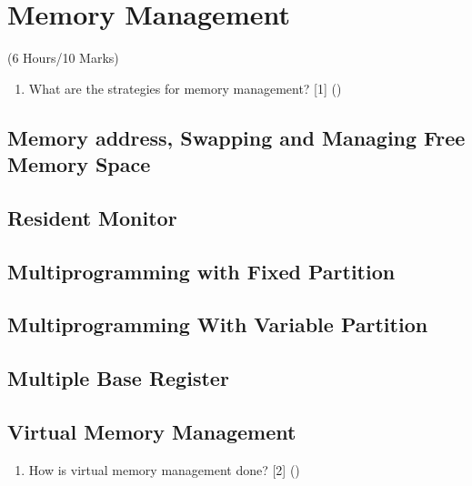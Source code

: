 \documentclass[12pt]{article}
\begin{document}
	\pagebreak

\section{Memory Management}
	\begin{center}(6 Hours/10 Marks)\end{center}
	
	\begin{enumerate}
		\item What are the strategies for memory management? \hfill [1] ()
	\end{enumerate}

	\subsection{Memory address, Swapping and Managing Free Memory Space}
	\subsection{Resident Monitor}
	\subsection{Multiprogramming with Fixed Partition}
	\subsection{Multiprogramming With Variable Partition}
	\subsection{Multiple Base Register}
	\subsection{Virtual Memory Management}
		\begin{enumerate}
			\item How is virtual memory management done? \hfill [2] ()
		\end{enumerate}
	
\end{document}
